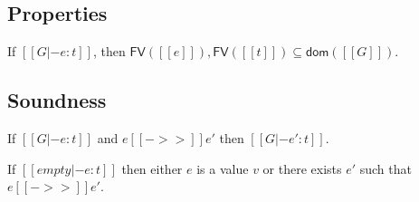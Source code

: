 \subsection{Properties}
\newcommand{\FV}{\mathsf{FV}}
\newcommand{\dom}{\mathsf{dom}}

\begin{lem}
If $[[G |- e:t]]$, then $\FV([[e]]),\FV([[t]]) \subseteq \dom([[G]])$.
\end{lem}

\begin{lem}
	
\end{lem}

\begin{lem}

\end{lem}

\subsection{Soundness}
\begin{lem}
If $[[G |- e:t]]$ and $e [[->>]] e'$ then $[[G |- e':t]]$.
\end{lem}

\begin{lem}[Progress]
If $[[empty |- e:t]]$ then either $e$ is a value $v$ or there exists $e'$ such that $e [[->>]] e'$.
\end{lem}

